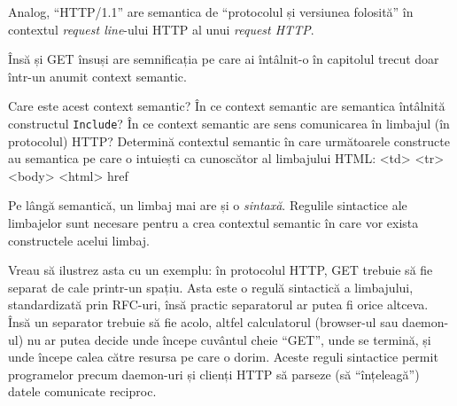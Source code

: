 Analog, ``HTTP/1.1'' are semantica de ``protocolul și versiunea folosită''
în contextul \textit{request line}-ului HTTP al unui \textit{request HTTP}.

\begin{Exercise}[title={Întrebări de sinteză},difficulty=2]
Însă și GET însuși are semnificația pe care ai întâlnit-o în capitolul
trecut doar într-un anumit context semantic.

\Question Care este acest context semantic?
\Question În ce context semantic are semantica întâlnită constructul \texttt{Include}?
\Question În ce context semantic are sens comunicarea în limbajul (în protocolul) HTTP?
\ExeText Determină contextul semantic în care următoarele constructe au semantica pe
care o intuiești ca cunoscător al limbajului HTML:
\Question <td>
\Question <tr>
\Question <body>
\Question <html>
\Question href
\end{Exercise}



Pe lângă semantică, un limbaj mai are și o \textsl{sintaxă}. Regulile sintactice
ale limbajelor sunt necesare pentru a crea contextul semantic în
care vor exista constructele acelui limbaj.

Vreau să ilustrez asta cu un exemplu: în protocolul HTTP, GET trebuie
să fie separat de cale printr-un spațiu. Asta este o regulă sintactică
a limbajului, standardizată prin
RFC-uri,
însă practic separatorul ar putea fi orice altceva.
Însă un separator trebuie să fie acolo, altfel calculatorul (browser-ul
sau daemon-ul) nu ar putea decide unde începe cuvântul cheie ``GET'', unde
se termină, și unde începe calea către resursa pe care o dorim.
Aceste reguli sintactice
permit programelor precum daemon-uri și clienți HTTP
să parseze (să ``înțeleagă'') datele comunicate reciproc.

